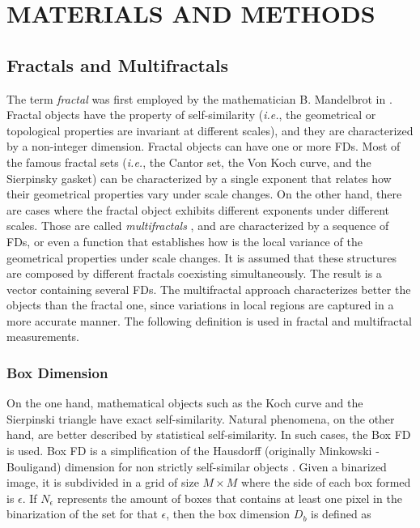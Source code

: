\documentclass[a4paper,10pt]{article}
\begin{document}



\section{MATERIALS AND METHODS}
\subsection{Fractals and Multifractals}

The term {\em fractal} was first employed by the mathematician B. Mandelbrot in \cite{Mandelbrot83}. Fractal objects have the property of self-similarity ({\em i.e.}, the geometrical or topological properties are invariant at different scales), and they are characterized by a non-integer dimension. Fractal objects can have one or more FDs. Most of the famous fractal sets ({\em i.e.}, the Cantor set, the Von Koch curve, and the Sierpinsky gasket) can be characterized by a single exponent that relates how their geometrical properties vary under scale changes. On the other hand, there are cases where the fractal object exhibits different exponents under different scales. Those are called {\it multifractals} \cite{Mandelbrot89}, and are characterized by a sequence of FDs, or even a function that establishes how is the local variance of the geometrical properties under scale changes. It is assumed that these structures are composed by different fractals coexisting simultaneously. The result is a vector containing several FDs. The multifractal approach characterizes better the objects than the fractal one, since variations in local regions are captured in a more accurate manner. The following definition is used in fractal and multifractal measurements.

\subsubsection{Box Dimension}
On the one hand, mathematical objects such as the Koch curve and the Sierpinski triangle have exact self-similarity. Natural phenomena, on the other hand, are better described by statistical self-similarity. In such cases, the Box FD is used. Box FD is a simplification of the Hausdorff (originally Minkowski - Bouligand) dimension for non strictly self-similar objects \cite{Peitgen2004}. Given a binarized image, it is subdivided in a grid of size $M\times M$ where the side of each box formed is $\epsilon$. If $N_{\epsilon}$ represents the amount of boxes that contains at least one pixel in the binarization of the set for that $\epsilon$, then the box dimension  $D_{b}$ is defined as
\end{document}

